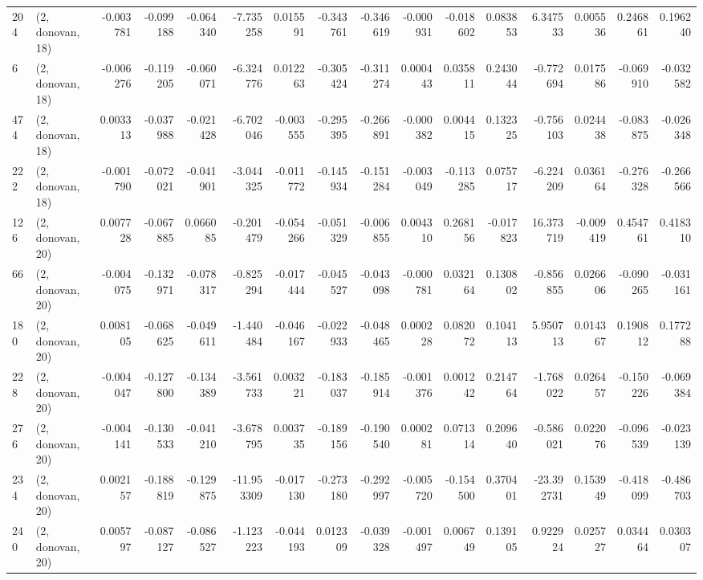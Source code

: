 \begin{tabular}{llrrrrrrrrrrrrrr}
204 &  (2, donovan, 18) &  -0.003781 & -0.099188 & -0.064340 &   -7.735258 &  0.015591 &  -0.343761 & -0.346619 & -0.000931 & -0.018602 &  0.083853 &    6.347533 &  0.005536 &  0.246861 &  0.196240 \\
6   &  (2, donovan, 18) &  -0.006276 & -0.119205 & -0.060071 &   -6.324776 &  0.012263 &  -0.305424 & -0.311274 &  0.000443 &  0.035811 &  0.243044 &   -0.772694 &  0.017586 & -0.069910 & -0.032582 \\
474 &  (2, donovan, 18) &   0.003313 & -0.037988 & -0.021428 &   -6.702046 & -0.003555 &  -0.295395 & -0.266891 & -0.000382 &  0.004415 &  0.132325 &   -0.756103 &  0.024438 & -0.083875 & -0.026348 \\
222 &  (2, donovan, 18) &  -0.001790 & -0.072021 & -0.041901 &   -3.044325 & -0.011772 &  -0.145934 & -0.151284 & -0.003049 & -0.113285 &  0.075717 &   -6.224209 &  0.036164 & -0.276328 & -0.266566 \\
126 &  (2, donovan, 20) &   0.007728 & -0.067885 &  0.066085 &   -0.201479 & -0.054266 &  -0.051329 & -0.006855 &  0.004310 &  0.268156 & -0.017823 &   16.373719 & -0.009419 &  0.454761 &  0.418310 \\
66  &  (2, donovan, 20) &  -0.004075 & -0.132971 & -0.078317 &   -0.825294 & -0.017444 &  -0.045527 & -0.043098 & -0.000781 &  0.032164 &  0.130802 &   -0.856855 &  0.026606 & -0.090265 & -0.031161 \\
180 &  (2, donovan, 20) &   0.008105 & -0.068625 & -0.049611 &   -1.440484 & -0.046167 &  -0.022933 & -0.048465 &  0.000228 &  0.082072 &  0.104113 &    5.950713 &  0.014367 &  0.190812 &  0.177288 \\
228 &  (2, donovan, 20) &  -0.004047 & -0.127800 & -0.134389 &   -3.561733 &  0.003221 &  -0.183037 & -0.185914 & -0.001376 &  0.001242 &  0.214764 &   -1.768022 &  0.026457 & -0.150226 & -0.069384 \\
276 &  (2, donovan, 20) &  -0.004141 & -0.130533 & -0.041210 &   -3.678795 &  0.003735 &  -0.189156 & -0.190540 &  0.000281 &  0.071314 &  0.209640 &   -0.586021 &  0.022076 & -0.096539 & -0.023139 \\
234 &  (2, donovan, 20) &   0.002157 & -0.188819 & -0.129875 &  -11.953309 & -0.017130 &  -0.273180 & -0.292997 & -0.005720 & -0.154500 &  0.370401 &  -23.392731 &  0.153949 & -0.418099 & -0.486703 \\
240 &  (2, donovan, 20) &   0.005797 & -0.087127 & -0.086527 &   -1.123223 & -0.044193 &   0.012309 & -0.039328 & -0.001497 &  0.006749 &  0.139105 &    0.922924 &  0.025727 &  0.034464 &  0.030307 \\

\end{tabular}
